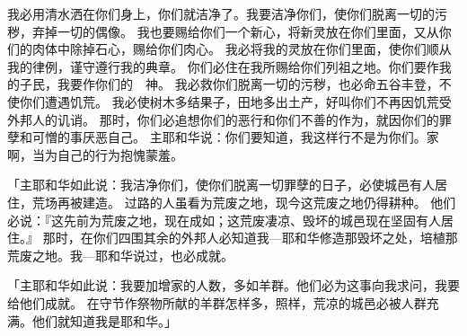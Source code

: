 {我必用清水洒在你们身上，你们就洁净了。我要洁净你们，使你们脱离一切的污秽，弃掉一切的偶像。
我也要赐给你们一个新心，将新灵放在你们里面，又从你们的肉体中除掉石心，赐给你们肉心。
我必将我的灵放在你们里面，使你们顺从我的律例，谨守遵行我的典章。
你们必住在我所赐给你们列祖之地。你们要作我的子民，我要作你们的　神。
我必救你们脱离一切的污秽，也必命五谷丰登，不使你们遭遇饥荒。
我必使树木多结果子，田地多出土产，好叫你们不再因饥荒受外邦人的讥诮。
那时，你们必追想你们的恶行和你们不善的作为，就因你们的罪孽和可憎的事厌恶自己。
主耶和华说：你们要知道，我这样行不是为你们。{}家啊，当为自己的行为抱愧蒙羞。
\par }{\PP {}「主耶和华如此说：我洁净你们，使你们脱离一切罪孽的日子，必使城邑有人居住，荒场再被建造。
过路的人虽看为荒废之地，现今这荒废之地仍得耕种。
他们必说：『这先前为荒废之地，现在成如{}；这荒废凄凉、毁坏的城邑现在坚固有人居住。』
那时，在你们四围其余的外邦人必知道我—耶和华修造那毁坏之处，培植那荒废之地。我—耶和华说过，也必成就。
\par }{\PP {}「主耶和华如此说：我要加增{}家的人数，多如羊群。他们必为这事向我求问，我要给他们成就。
在守节作祭物所献的羊群怎样多，照样，荒凉的城邑必被人群充满。他们就知道我是耶和华。」

}
